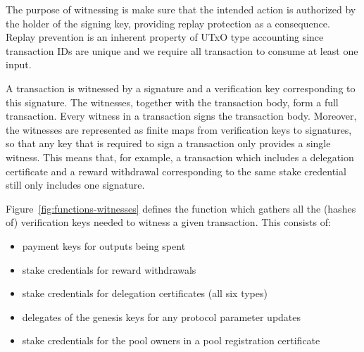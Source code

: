 The purpose of witnessing is make sure that the intended action is authorized by
the holder of the signing key, providing replay protection as a consequence.
Replay prevention is an inherent property of UTxO type accounting
since transaction IDs are unique and we require all transaction to
consume at least one input.

A transaction is witnessed by a signature and a verification key corresponding
to this signature.  The witnesses, together with the transaction body, form a
full transaction.  Every witness in a transaction signs the transaction body.
Moreover, the witnesses are represented as finite maps from verification keys to
signatures, so that any key that is required to sign a transaction only provides
a single witness.  This means that, for example, a transaction which includes a
delegation certificate and a reward withdrawal corresponding to the same stake
credential still only includes one signature.

Figure~\ref{fig:functions-witnesses} defines the function which
gathers all the (hashes of) verification keys needed to witness a given transaction.
This consists of:
\begin{itemize}
  \item payment keys for outputs being spent
  \item stake credentials for reward withdrawals
  \item stake credentials for delegation certificates (all six types)
  \item delegates of the genesis keys for any protocol parameter updates
  \item stake credentials for the pool owners in a pool registration certificate
\end{itemize}

